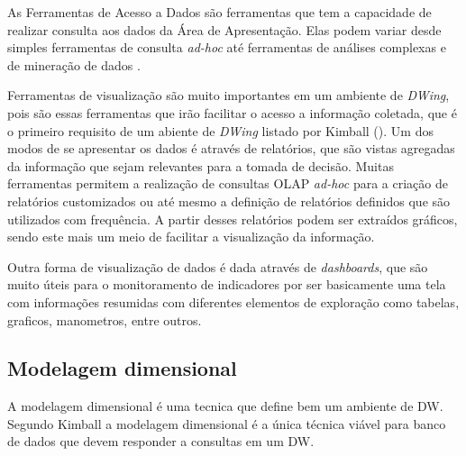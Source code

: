 As Ferramentas de Acesso a Dados são ferramentas que tem a capacidade de realizar consulta aos dados da Área de Apresentação. Elas podem variar desde simples ferramentas de consulta \emph{ad-hoc} até ferramentas de análises complexas e de mineração de dados \cite{kimball2002}.

Ferramentas de visualização são muito importantes em um ambiente de \emph{DWing}, pois são essas ferramentas que irão facilitar o acesso a informação coletada, que é o primeiro requisito de um abiente de \emph{DWing} listado por Kimball (\citeyear{kimball2002}). Um dos modos de se apresentar os dados é através de relatórios, que são vistas agregadas da informação que sejam relevantes para a tomada de decisão. Muitas ferramentas permitem a realização de consultas OLAP \emph{ad-hoc} para a criação de relatórios customizados ou até mesmo a definição de relatórios definidos que são utilizados com frequência. A partir desses relatórios podem ser extraídos gráficos, sendo este mais um meio de facilitar a visualização da informação. 

Outra forma de visualização de dados é dada através  de \emph{dashboards}, que são muito úteis para o monitoramento de indicadores por ser basicamente uma tela com informações resumidas com diferentes elementos de exploração como tabelas, graficos, manometros, entre outros.



\subsection{Modelagem dimensional}
\label{sec-dimensional-modeling}

A modelagem dimensional é uma tecnica que define bem um ambiente de DW. Segundo Kimball \citeyear{kimball2002} a modelagem dimensional é a única técnica viável para banco de dados  que devem responder a consultas em um DW.


